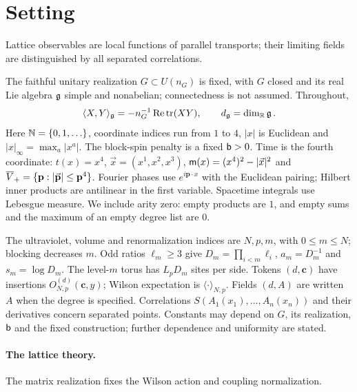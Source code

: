 \section{Setting}\label{sec:setting}

Lattice observables are local functions of parallel transports; their limiting fields are distinguished by all separated correlations.

The faithful unitary realization $G\subset U(n_G)$ is fixed, with $G$ closed and its real Lie algebra $\mathfrak{g}$ simple and nonabelian; connectedness is not assumed. Throughout,
\begin{equation}\label{eq:gauge-metric}
\langle X,Y\rangle_{\mathfrak{g}}=-n_G^{-1}\operatorname{Re}\operatorname{tr}(XY),\qquad d_{\mathfrak{g}}=\dim_{\mathbb{R}}\mathfrak{g}\,.
\end{equation}
Here $\mathbb{N}=\{0,1,\ldots\}$, coordinate indices run from $1$ to $4$, $|x|$ is Euclidean and $|x|_\infty=\max_a|x^a|$. The block-spin penalty is a fixed $\mathsf{b}>0$. Time is the fourth coordinate: $t(x)=x^4$, $\vec x=(x^1,x^2,x^3)$, $\mathsf{m}(x)=(x^4)^2-|\vec x|^2$ and $\overline{V}_+=\{\mathbf p:|\vec{\mathbf p}|\le\mathbf p^4\}$. Fourier phases use $e^{i\mathbf p\cdot x}$ with the Euclidean pairing; Hilbert inner products are antilinear in the first variable. Spacetime integrals use Lebesgue measure. We include arity zero: empty products are $1$, and empty sums and the maximum of an empty degree list are $0$.

The ultraviolet, volume and renormalization indices are $N,p,m$, with $0\le m\le N$; blocking decreases $m$. Odd ratios $\ell_m\ge3$ give $D_m=\prod_{i<m}\ell_i$, $a_m=D_m^{-1}$ and $s_m=\log D_m$. The level-$m$ torus has $L_pD_m$ sites per side. Tokens $(d,\mathbf c)$ have insertions $O^{(d)}_{N,p}(\mathbf c,y)$; Wilson expectation is $\langle\cdot\rangle_{N,p}$. Fields $(d,A)$ are written $A$ when the degree is specified. Correlations $S(A_1(x_1),\ldots,A_n(x_n))$ and their derivatives concern separated points. Constants may depend on $G$, its realization, $\mathsf{b}$ and the fixed construction; further dependence and uniformity are stated.
\paragraph{The lattice theory.} The matrix realization fixes the Wilson action and coupling normalization.

